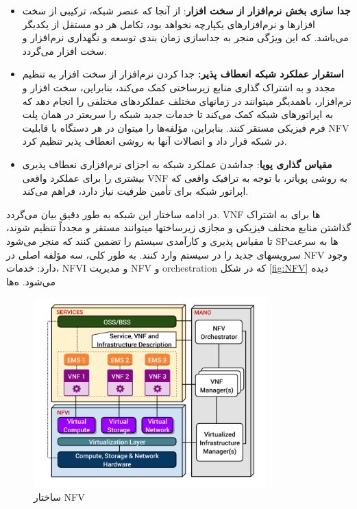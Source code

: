  \begin{itemize}
  \item \textbf{جدا سازی بخش نرم‌افزار از سخت افزار}:
از آنجا که عنصر شبکه، ترکیبی از سخت افزارها و نرم‌افزارهای یکپارچه نخواهد بود، تکامل هر دو مستقل از یکدیگر می‌باشد.
که این ویژگی منجر به جداسازی زمان بندی توسعه و نگهداری نرم‌افزار و سخت افزار می‌گردد.
\item \textbf{استقرار عملکرد شبکه انعطاف پذیر:}
جدا کردن نرم‌افزار از سخت افزار به تنظیم مجدد و به اشتراک گذاری منابع زیرساختی کمک می‌کند،
بنابراین، سخت افزار و نرم‌افزار، باهمدیگر
میتوانند در زمانهای مختلف عملکردهای مختلفی را انجام دهد که به اپراتورهای شبکه کمک می‌کند تا خدمات جدید شبکه را سریعتر در همان پلت فرم فیزیکی مستقر کنند.
بنابراین،
مؤلفه‌ها را میتوان در هر دستگاه با قابلیت NFV در شبکه قرار داد و اتصالات آنها به روشی انعطاف پذیر تنظیم کرد.
\item \textbf{مقیاس گذاری پویا}:
  جداشدن عملکرد شبکه به اجزای نرم‌افزاری  نعطاف پذیری بیشتری را برای  عملکرد واقعی VNF به روشی پویاتر، 
   با توجه به ترافیک واقعی که اپراتور شبکه برای تأمین ظرفیت نیاز دارد،
  فراهم می‌کند.
\end{itemize}  
در ادامه ساختار این شبکه به طور دقیق بیان می‌گردد.
 VNF
ها برای به اشتراک گذاشتن منابع مختلف فیزیکی و مجازی زیرساختها میتوانند مستقر و مجدداً تنظیم شوند، تا مقیاس پذیری و کارآمدی سیستم را تضمین کنند که منجر می‌شود SPها به سرعت سرویسهای جدید را در سیستم وارد کنند.
 به طور کلی، سه مؤلفه اصلی در NFV وجود دارد:
 خدمات، NFVI و مدیریت NFV و orchestration
 که در شکل \eqref{fig:NFV} دیده می‌شود. ه‌ها
 \begin{figure}
  \centering
    \includegraphics[width=0.8\textwidth]{./fig/NFV}
  \caption{ساختار NFV \cite{NFVArch}}
  \label{fig:NFV}
\end{figure} 
